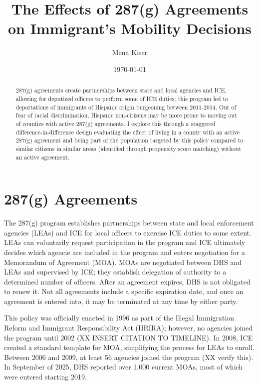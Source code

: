 \documentclass{article}
\title{The Effects of 287(g) Agreements on Immigrant's Mobility Decisions}
\author{Mena Kiser}
\date{\today}
\begin{document}
\doublespacing
\maketitle

\begin{abstract}
    287(g) agreements create partnerships between state and local agencies and ICE, allowing for deputized officers to perform some of ICE duties; this program led to deportations of immigrants of Hispanic origin burgeoning between 2011-2014. Out of fear of racial discrimination, Hispanic non-citizens may be more prone to moving out of counties with active 287(g) agreements. I explore this through a staggered difference-in-difference design evaluating the effect of living in a county with an active 287(g) agreement and being part of the population targeted by this policy compared to similar citizens in similar areas (identified through propensity score matching) without an active agreement. 
\end{abstract}


\section{287(g) Agreements}
The 287(g) program establishes partnerships between state and local enforcement agencies (LEAs) and ICE for local officers to exercise ICE duties to some extent. LEAs can voluntarily request participation in the program and ICE ultimately decides which agencie are included in the program and enters negotiation for a Memorandum of Agreement (MOA). MOAs are negotiated between DHS and LEAs and supervised by ICE; they establish delegation of authority to a determined number of officers. After an agreement expires, DHS is not obligated to renew it. Not all agreements include a specific expiration date, and once an agreement is entered into, it may be terminated at any time by either party.

This policy was officially enacted in 1996 as part of the Illegal Immigration Reform and Immigrant Responsibility Act (IIRIRA); however, no agencies joined the program until 2002 (XX INSERT CITATION TO TIMELINE). In 2008, ICE created a standard template for MOA, simplifying the process for LEAs to enroll. Between 2006 and 2009, at least 56 agencies joined the program (XX verify this). In September of 2025, DHS reported over 1,000 current MOAs, most of which were entered starting 2019.
\end{document}
